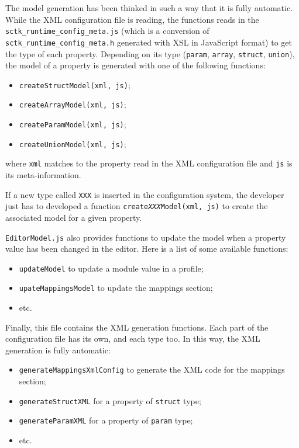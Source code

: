 \documentclass{article}
\begin{document}
\noindent The model generation has been thinked in such a way that it is fully  automatic. While the XML configuration file is reading, the functions reads in the \texttt{sctk\_runtime\_config\_meta.js} (which is a conversion of \texttt{sctk\_runtime\_config\_meta.h} generated with XSL in JavaScript format) to get the type of each property. Depending on its type (\texttt{param}, \texttt{array}, \texttt{struct}, \texttt{union}), the model of a property is generated with one of the following functions:
\begin{itemize}
\item \texttt{createStructModel(xml, js)};
\item \texttt{createArrayModel(xml, js)};
\item \texttt{createParamModel(xml, js)};
\item \texttt{createUnionModel(xml, js)};
\end{itemize}
where \texttt{xml} matches to the property read in the XML configuration file and \texttt{js} is its meta-information.
\newline

\noindent If a new type called \texttt{XXX} is inserted in the configuration system, the developer just has to developed a function \texttt{create\textit{XXX}Model(xml, js)} to create the associated model for a given property.
\newline

\noindent \texttt{EditorModel.js} also provides functions to update the model when a property value has been changed in the editor. Here is a list of some available functions:
\begin{itemize}
\item \texttt{updateModel} to update a module value in a profile;
\item \texttt{upateMappingsModel} to update the mappings section;
\item etc.
\end{itemize}

\noindent Finally, this file contains the XML generation functions. Each part of the configuration file has its own, and each type too. In this way, the XML generation is fully automatic:
\begin{itemize}
\item \texttt{generateMappingsXmlConfig} to generate the XML code for the mappings section;
\item \texttt{generateStructXML} for a property of \texttt{struct} type;
\item \texttt{generateParamXML} for a property of \texttt{param} type;
\item etc.
\end{itemize}
\end{document}

